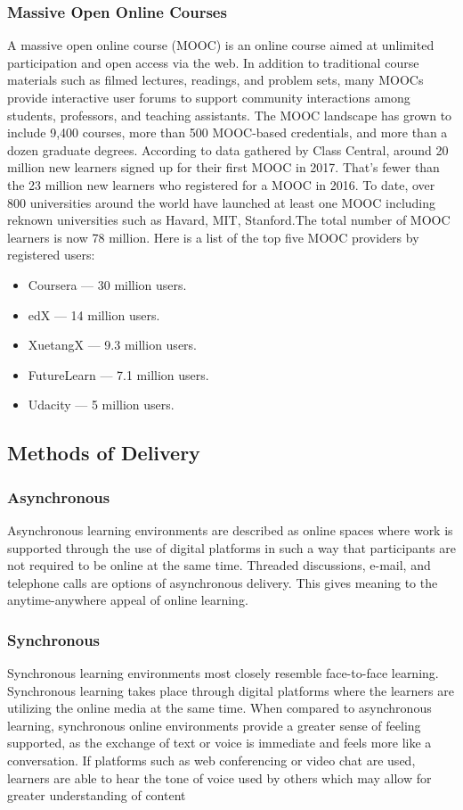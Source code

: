 \documentclass[12pt]{article}
\begin{document}
		\subsubsection{Massive Open Online Courses}
		A massive open online course (MOOC) is an online course aimed at unlimited participation and open access via the web\cite{mooc}. In addition to traditional course materials such as filmed lectures, readings, and problem sets, many MOOCs provide interactive user forums to support community interactions among students, professors, and teaching assistants. The MOOC landscape has grown to include 9,400 courses, more than 500 MOOC-based credentials, and more than a dozen graduate degrees\cite{ccentral}. According to data gathered by Class Central, around 20 million new learners signed up for their first MOOC in 2017. That's fewer than the 23 million new learners who registered for a MOOC in 2016. To date, over 800 universities around the world have launched at least one MOOC including reknown universities such as Havard\cite{havard}, MIT\cite{mit}, Stanford\cite{stanford}.The total number of MOOC learners is now 78 million. Here is a list of the top five MOOC providers by registered users\cite{ccentral}:
			\begin{itemize}
			
				\item Coursera — 30 million users.
				\item edX — 14 million users.
				\item XuetangX — 9.3 million users.
				\item FutureLearn — 7.1 million users.
				\item Udacity — 5 million users.
			
			\end{itemize}
	\subsection{Methods of Delivery}
		\subsubsection{Asynchronous}
		Asynchronous learning environments are described as online spaces where work is supported through the use of digital platforms in such a way that participants are not required to be online at the same time.\cite{async} Threaded discussions, e-mail, and telephone calls are options of asynchronous delivery.  This gives meaning to the anytime-anywhere appeal of online learning.
		\subsubsection{Synchronous}
		Synchronous learning environments most closely resemble face-to-face learning.  Synchronous learning takes place through digital platforms where the learners are utilizing the online media at the same time.  When compared to asynchronous learning, synchronous online environments provide a greater sense of feeling supported, as the exchange of text or voice is immediate and feels more like a conversation.  If platforms such as web conferencing or video chat are used, learners are able to hear the tone of voice used by others which may allow for greater understanding of content
\end{document}
